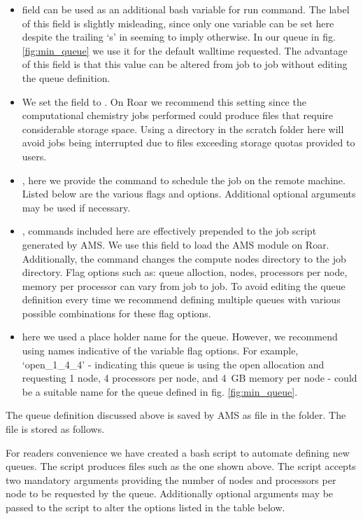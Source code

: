 \begin{itemize}
    \item 
     field can be used as an additional bash variable for run command. 
    The label of this field is slightly misleading, since only one variable can be set here despite the trailing `s' in  seeming to imply otherwise. 
    In our queue in fig. \ref{fig:min_queue} we use it for the default walltime requested. 
    The advantage of this field is that this value can be altered from job to job without editing the queue definition. 
    \item 
    We set the  field to . 
    On Roar we recommend this setting since the computational chemistry jobs performed could produce files that require considerable storage space. 
    Using a directory in the scratch folder here will avoid jobs being interrupted due to files exceeding storage quotas provided to users.
    \item 
    , here we provide the  command to schedule the job on the remote machine. 
    Listed below are the various flags and options. 
    Additional optional arguments may be used if necessary.
    
    \item 
    , commands included here are effectively prepended to the job script generated by AMS. 
    We use this field to load the AMS module on Roar. 
    Additionally, the command  changes the compute nodes directory to the job directory. 
    Flag options such as: queue alloction, nodes, processors per node, memory per processor can vary from job to job. 
    To avoid editing the queue definition every time we recommend defining multiple queues with various possible combinations for these flag options.
    \item 
     here we used a place holder name for the queue. 
    However, we recommend using names indicative of the variable flag options. 
    For example, `open\_1\_4\_4' - indicating this queue is using the open allocation and requesting 1 node, 4 processors per node, and 4~GB memory per node - could be a suitable name for the queue defined in fig. \ref{fig:min_queue}.
\end{itemize}
The queue definition discussed above is saved by AMS as  file in the  folder. 
The file is stored as follows.

For readers convenience we have created a bash script to automate defining new queues.
The script produces  files such as the one shown above. 
The script accepts two mandatory arguments providing the number of nodes and processors per node to be requested by the queue. 
Additionally optional arguments may be passed to the script to alter the options listed in the table below. 

